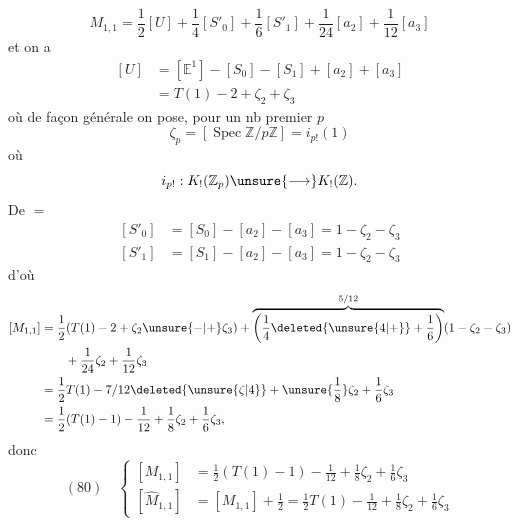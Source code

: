 \[
M_{1,1}=\frac12[U]+\frac14[S'_0]+\frac16[S'_1]+\frac1{24}[a_2]+\frac1{12}[a_3]
\]
et on a
\[
\begin{aligned}
[U]&=[\mathbb E^1]-[S_0]-[S_1]+[a_2]+[a_3]\\
&=T(1)-2+\zeta_2+\zeta_3
\end{aligned}
\]
où de façon générale on pose, pour un nb premier $p$
\[
\zeta_p=[\operatorname{Spec}\mathbb Z/p\mathbb Z]=i_{p!}(1)
\]
où
\[
i_{p!}:K_!(\mathbb Z_p)\unsure{\longrightarrow} K_!(\mathbb Z).
\]
De $=$
\[
\begin{aligned}
[S'_0]&=[S_0]-[a_2]-[a_3]=1-\zeta_2-\zeta_3\\
[S'_1]&=[S_1]-[a_2]-[a_3]=1-\zeta_2-\zeta_3
\end{aligned}
\]
d'où
\[
\begin{aligned}
[M_{1,1}]&=\frac12(T(1)-2+\zeta_2\unsure{-|+}\zeta_3)+\overbrace{\left(\frac14\deleted{\unsure{4|+}}+\frac16\right)}^{5/12}(1-\zeta_2-\zeta_3)\\
&\qquad+\frac1{24}\zeta_2+\frac1{12}\zeta_3\\
&=\frac12T(1)-7/12\deleted{\unsure{\zeta|4}}+\unsure{\frac18}\zeta_2+\frac16\zeta_3\\
&=\frac12(T(1)-1)-\frac1{12}+\frac18\zeta_2+\frac16\zeta_3,
\end{aligned}
\]
donc
\[
(80)\quad\left\{\begin{aligned}
[M_{1,1}]&=\frac12(T(1)-1)-\frac1{12}+\frac18\zeta_2+\frac16\zeta_3\\
[\widehat M_{1,1}]&=[M_{1,1}]+\frac12=\frac12T(1)-\frac1{12}+\frac18\zeta_2+\frac16\zeta_3
\end{aligned}\right.
\]

